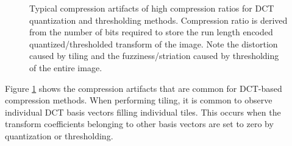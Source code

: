 \documentclass[conference]{IEEEtran}
\begin{document}
\begin{figure}
    \quad
    \caption{
        Typical compression artifacts of high compression ratios for DCT quantization and thresholding methods.
        Compression ratio is derived from the number of bits required to store the run length encoded quantized/thresholded transform of the image.
        Note the distortion caused by tiling and the fuzziness/striation caused by thresholding of the entire image.}
    \label{fig:dct_results}
\end{figure}

Figure \ref{fig:dct_results} shows the compression artifacts that are common for DCT-based compression methods.
When performing tiling, it is common to observe individual DCT basis vectors filling individual tiles.
This occurs when the transform coefficients belonging to other basis vectors are set to zero by quantization or thresholding.
\end{document}
